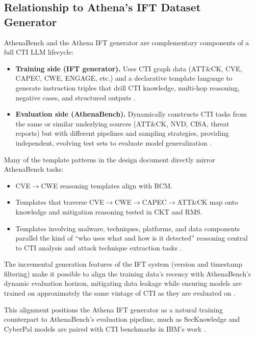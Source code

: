 \documentclass[unnumsec,webpdf,contemporary,large]{oup-authoring-template}
\theoremstyle{thmstyleone}
\theoremstyle{thmstyletwo}
\theoremstyle{thmstylethree}
\begin{document}
\subsection{Relationship to Athena's IFT Dataset Generator}

AthenaBench and the Athena IFT generator are complementary components of a full CTI LLM lifecycle:

\begin{itemize}
  \item \textbf{Training side (IFT generator).} Uses CTI graph data (ATT\&CK, CVE, CAPEC, CWE, ENGAGE, etc.) and a declarative template language to generate instruction triples that drill CTI knowledge, multi-hop reasoning, negative cases, and structured outputs \cite{cardei2025ift}.
  \item \textbf{Evaluation side (AthenaBench).} Dynamically constructs CTI tasks from the same or similar underlying sources (ATT\&CK, NVD, CISA, threat reports) but with different pipelines and sampling strategies, providing independent, evolving test sets to evaluate model generalization \cite{alam2025athenabench}.
\end{itemize}

Many of the template patterns in the design document directly mirror AthenaBench tasks:
\begin{itemize}
  \item CVE$\rightarrow$CWE reasoning templates align with RCM.
  \item Templates that traverse CVE$\rightarrow$CWE$\rightarrow$CAPEC$\rightarrow$ATT\&CK map onto knowledge and mitigation reasoning tested in CKT and RMS.
  \item Templates involving malware, techniques, platforms, and data components parallel the kind of ``who uses what and how is it detected'' reasoning central to CTI analysis and attack technique extraction tasks \cite{cardei2025ift}.
\end{itemize}

The incremental generation features of the IFT system (version and timestamp filtering) make it possible to align the training data's recency with AthenaBench's dynamic evaluation horizon, mitigating data leakage while ensuring models are trained on approximately the same vintage of CTI as they are evaluated on \cite{cardei2025ift,alam2025athenabench}.

This alignment positions the Athena IFT generator as a natural training counterpart to AthenaBench's evaluation pipeline, much as SecKnowledge and CyberPal models are paired with CTI benchmarks in IBM's work \cite{levi2024cyberpal,levi2025toward}.
\end{document}

